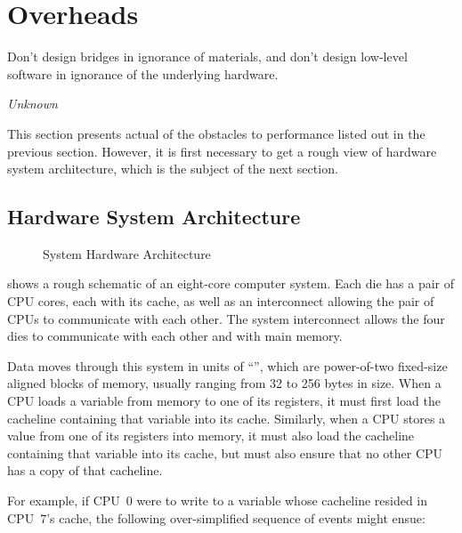 
\section{Overheads}
\label{sec:cpu:Overheads}
%
\epigraph{Don't design bridges in ignorance of materials, and don't design
	  low-level software in ignorance of the underlying hardware.}
	 {\emph{Unknown}}

This section presents actual  of the obstacles to performance
listed out in the previous section.
However, it is first necessary to get a rough view of hardware system
architecture, which is the subject of the next section.

\subsection{Hardware System Architecture}
\label{sec:cpu:Hardware System Architecture}

\begin{figure}
\centering
{}
\caption{System Hardware Architecture}
\label{fig:cpu:System Hardware Architecture}
\end{figure}

shows a rough schematic of an eight-core computer system.
Each die has a pair of CPU cores, each with its cache, as well as an
interconnect allowing the pair of CPUs to communicate with each other.
The system interconnect allows the four dies to communicate with each
other and with main memory.

Data moves through this system in units of ``'', which
are power-of-two fixed-size aligned blocks of memory, usually ranging
from 32 to 256 bytes in size.
When a CPU loads a variable from memory to one of its registers, it must
first load the cacheline containing that variable into its cache.
Similarly, when a CPU stores a value from one of its registers into
memory, it must also load the cacheline containing that variable into
its cache, but must also ensure that no other CPU has a copy of that
cacheline.

For example, if CPU~0 were to write to a variable whose cacheline
resided in CPU~7's cache, the following over-simplified sequence of
events might ensue:

